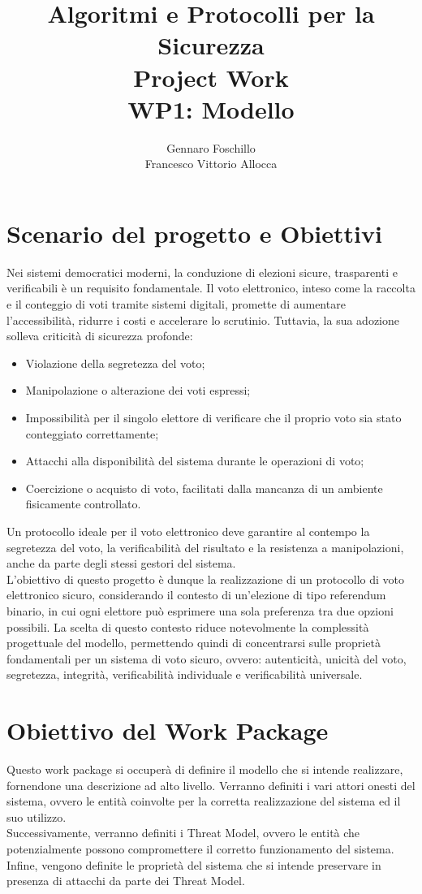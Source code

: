 \documentclass[a4paper,12pt]{article}
\title{Algoritmi e Protocolli per la Sicurezza\\Project Work\\WP1: Modello}
\author{Gennaro Foschillo\\ Francesco Vittorio Allocca}
\begin{document}
\maketitle

\section{Scenario del progetto e Obiettivi}
    Nei sistemi democratici moderni, la conduzione di elezioni sicure,
    trasparenti e verificabili è un requisito fondamentale. Il voto elettronico,
    inteso come la raccolta e il conteggio di voti tramite sistemi digitali, promette
    di aumentare l'accessibilità, ridurre i costi e accelerare lo scrutinio. Tuttavia,
    la sua adozione solleva criticità di sicurezza profonde:
        \begin{itemize}
        \item{Violazione della segretezza del voto;}
        \item{Manipolazione o alterazione dei voti espressi;}
        \item{Impossibilità per il singolo elettore di verificare che il proprio voto sia
        stato conteggiato correttamente;}
        \item{Attacchi alla disponibilità del sistema durante le operazioni di voto;}
        \item{Coercizione o acquisto di voto, facilitati dalla mancanza di un ambiente fisicamente controllato.}
        \end{itemize}
    Un protocollo ideale per il voto elettronico deve garantire al contempo
    la segretezza del voto, la verificabilità del risultato e la resistenza a manipolazioni, anche da parte degli stessi gestori del sistema.\\
    L'obiettivo di questo progetto è dunque la realizzazione di un protocollo di voto elettronico
    sicuro, considerando il contesto di un'elezione di tipo referendum binario, in cui ogni elettore 
    può esprimere una sola preferenza tra due opzioni possibili. La scelta di questo contesto riduce
    notevolmente la complessità progettuale del modello, permettendo quindi di concentrarsi sulle proprietà
    fondamentali per un sistema di voto sicuro, ovvero: autenticità, unicità del voto, segretezza, integrità, verificabilità individuale e verificabilità universale.
\section{Obiettivo del Work Package}
    Questo work package si occuperà di definire il modello che si intende realizzare, fornendone
    una descrizione ad alto livello. 
    Verranno definiti i vari attori onesti del sistema, 
    ovvero le entità coinvolte per la corretta
    realizzazione del sistema ed il suo utilizzo.\\
    Successivamente, verranno definiti
    i Threat Model, ovvero le entità che potenzialmente possono compromettere
    il corretto funzionamento del sistema.\\
    Infine, vengono definite le proprietà del sistema che si intende preservare in presenza di attacchi da parte
    dei Threat Model.
\end{document}
